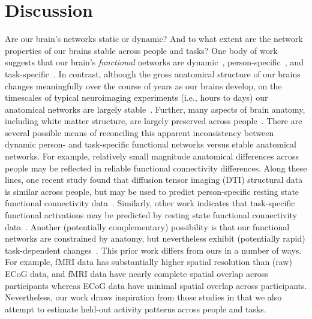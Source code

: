 \documentclass[11pt]{article}
\begin{document}
\section*{Discussion} Are our brain's networks static or dynamic?  And to what
extent are the network properties of our brains stable across people and tasks?
One body of work suggests that our brain's \textit{functional} networks are
dynamic~\citep[e.g., ][]{MannEtal18, OwenEtal19}, person-specific~\citep[e.g.,
][]{FinnEtal15}, and task-specific~\citep[e.g., ][]{Turk13}.  In contrast,
although the gross anatomical structure of our brains changes meaningfully over
the course of years as our brains develop, on the timescales of typical
neuroimaging experiments (i.e., hours to days) our anatomical networks are
largely stable~\citep[e.g., ][]{CaseEtal00}.  Further, many aspects of brain
anatomy, including white matter structure, are largely preserved across
people~\citep[e.g., ][]{TalaTour88, JahaEtal13, MoriEtal08}. There are several
possible means of reconciling this apparent inconsistency between dynamic
person- and task-specific functional networks versus stable anatomical networks.
For example, relatively small magnitude anatomical differences across people may
be reflected in reliable functional connectivity differences.  Along these
lines, one recent study found that diffusion tensor imaging (DTI) structural
data is similar across people, but may be used to predict person-specific
resting state functional connectivity data~\citep{BeckEtal18}.  Similarly, other
work indicates that task-specific functional activations may be predicted by
resting state functional connectivity data~\citep{ColeEtal16, TavoEtal16}.
Another (potentially complementary) possibility is that our functional networks
are constrained by anatomy, but nevertheless exhibit (potentially rapid)
task-dependent changes~\citep[e.g., ][]{SporBetz16}.  This prior work differs
from ours in a number of ways.  For example, fMRI data has substantially higher
spatial resolution than (raw) ECoG data, and fMRI data have nearly complete
spatial overlap across participants whereas ECoG data have minimal spatial
overlap across participants.  Nevertheless, our work draws inspiration from
those studies in that we also attempt to estimate held-out activity patterns
across people and tasks.
\end{document}
